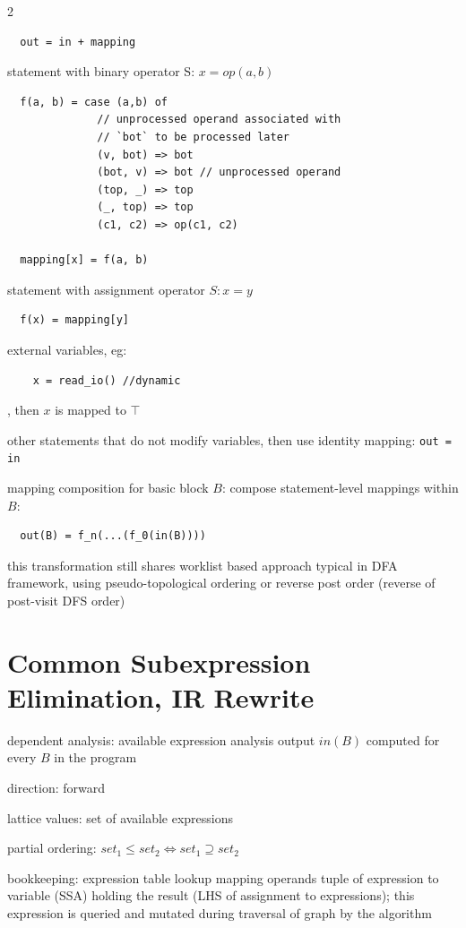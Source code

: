 \documentclass[8pt]{extarticle}
\begin{document}
\begin{multicols*}{2}
  \begin{verbatim}
  out = in + mapping
  \end{verbatim}

  statement with binary operator S: $x = op(a, b)$
  \begin{verbatim}
  f(a, b) = case (a,b) of
              // unprocessed operand associated with
              // `bot` to be processed later
              (v, bot) => bot
              (bot, v) => bot // unprocessed operand
              (top, _) => top
              (_, top) => top
              (c1, c2) => op(c1, c2)

  mapping[x] = f(a, b)
  \end{verbatim}
  statement with assignment operator $S: x = y$
  \begin{verbatim}
  f(x) = mapping[y]
  \end{verbatim}

  external variables, eg:
  \begin{verbatim}
    x = read_io() //dynamic
  \end{verbatim}, then
  $x$ is mapped to $\top$

  other statements that do not modify variables, then use identity mapping: \verb|out = in|

  mapping composition for basic block $B$: compose statement-level mappings within $B$:
  \begin{verbatim}
  out(B) = f_n(...(f_0(in(B))))
  \end{verbatim}  
  
  this transformation still shares worklist based approach typical in DFA framework, using pseudo-topological ordering or reverse post order (reverse of post-visit DFS order)
  
  \vfill\null
  \columnbreak

  \section{Common Subexpression Elimination, IR Rewrite}
  
  dependent analysis: available expression analysis output $in(B)$ computed for every $B$ in the program

  direction: forward

  lattice values: set of available expressions

  partial ordering: $set_1 \leq set_2 \iff set_1 \supseteq set_2$

  bookkeeping: expression table lookup mapping operands tuple of expression to variable (SSA) holding the result (LHS of assignment to expressions); this expression is queried and mutated during  traversal of graph by the algorithm


\end{multicols*}
\end{document}
